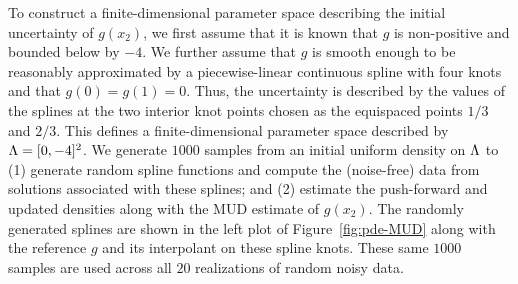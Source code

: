 To construct a finite-dimensional parameter space describing the initial uncertainty of $g(x_2)$, we first assume that it is known that $g$ is non-positive and bounded below by $-4$.
We further assume that $g$ is smooth enough to be reasonably approximated by a piecewise-linear continuous spline with four knots and that $g(0)=g(1)=0$.
Thus, the uncertainty is described by the values of the splines at the two interior knot points chosen as the equispaced points $1/3$ and $2/3$.
This defines a finite-dimensional parameter space described by ${\Lambda} = [0,-4]^2$.
We generate $1000$ samples from an initial uniform density on ${\Lambda}$ to (1) generate random spline functions and compute the (noise-free) data from solutions associated with these splines; and (2) estimate the push-forward and updated densities along with the MUD estimate of $g(x_2)$.
The randomly generated splines are shown in the left plot of Figure~\ref{fig:pde-MUD} along with the reference $g$ and its interpolant on these spline knots.
These same $1000$ samples are used across all $20$ realizations of random noisy data.


